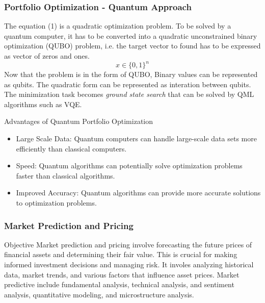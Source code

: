 \documentclass{beamer}
\begin{document}
\begin{frame}
	\frametitle{Portfolio Optimization - Quantum Approach}
	The equation (1) is a quadratic optimization problem. To be solved by a quantum computer, it has to be converted into a quadratic unconstrained binary optimization (QUBO) problem, i.e. the target
	vector to found has to be expressed as vector of zeros and ones. 
	\[x \in \{0,1\}^n\]
	Now that the problem is in the form of QUBO, Binary values can be represented as qubits. The quadratic form can be represented as interation between qubits. The minimization task becomes \textit{ground state search} that can be solved by QML algorithms such as VQE.
\end{frame}
\begin{frame}
	\begin{block}{Advantages of Quantum Portfolio Optimization}
		\begin{itemize}
			\item Large Scale Data: Quantum computers can handle large-scale data sets more efficiently than classical computers.
			\item Speed: Quantum algorithms can potentially solve optimization problems faster than classical algorithms.
			\item Improved Accuracy: Quantum algorithms can provide more accurate solutions to optimization problems.
		\end{itemize}
	\end{block}
\end{frame}
\begin{frame}
	\frametitle{Market Prediction and Pricing}
	\begin{block}{Objective}
		Market prediction and pricing involve forecasting the future prices of financial assets and determining their fair value. This is crucial for making informed investment decisions and managing risk.
		It involes analyzing historical data, market trends, and various factors that influence asset prices. Market predictive include fundamental analysis, technical analysis, and sentiment analysis, quantitative modeling, and
		microstructure analysis.
	\end{block}
	

\end{frame}
\end{document}
